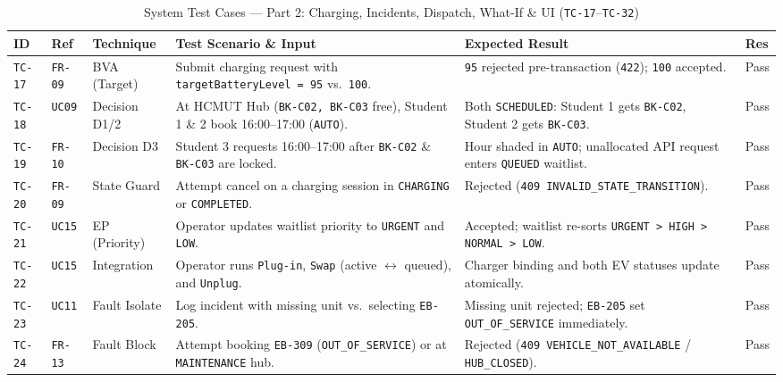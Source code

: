 \begin{table}[H]
  \centering
  \singlespacing\scriptsize
  \caption{System Test Cases --- Part 2: Charging, Incidents, Dispatch, What-If \& UI (\texttt{TC-17}--\texttt{TC-32})}
  \label{tab:tc-part2}
  \renewcommand{\arraystretch}{1.20}
  \begin{tabularx}{\textwidth}{|C{1.25cm}|C{1.40cm}|L{1.95cm}|Y|L{3.95cm}|C{0.95cm}|}
    \hline
    \textbf{ID} & \textbf{Ref} & \textbf{Technique} & \textbf{Test Scenario \& Input} & \textbf{Expected Result} & \textbf{Res} \\
    \hline
    \texttt{TC-17} & \texttt{FR-09} & BVA (Target) & Submit charging request with \texttt{targetBatteryLevel = 95} vs.\ \texttt{100}. & \texttt{95} rejected pre-transaction (\texttt{422}); \texttt{100} accepted. & Pass \\
    \hline
    \texttt{TC-18} & \texttt{UC09} & Decision D1/2 & At HCMUT Hub (\texttt{BK-C02, BK-C03} free), Student 1 \& 2 book 16:00--17:00 (\texttt{AUTO}). & Both \texttt{SCHEDULED}: Student 1 gets \texttt{BK-C02}, Student 2 gets \texttt{BK-C03}. & Pass \\
    \hline
    \texttt{TC-19} & \texttt{FR-10} & Decision D3 & Student 3 requests 16:00--17:00 after \texttt{BK-C02} \& \texttt{BK-C03} are locked. & Hour shaded in \texttt{AUTO}; unallocated API request enters \texttt{QUEUED} waitlist. & Pass \\
    \hline
    \texttt{TC-20} & \texttt{FR-09} & State Guard & Attempt cancel on a charging session in \texttt{CHARGING} or \texttt{COMPLETED}. & Rejected (\texttt{409 INVALID\_\allowbreak STATE\_\allowbreak TRANSITION}). & Pass \\
    \hline
    \texttt{TC-21} & \texttt{UC15} & EP (Priority) & Operator updates waitlist priority to \texttt{URGENT} and \texttt{LOW}. & Accepted; waitlist re-sorts \texttt{URGENT > HIGH > NORMAL > LOW}. & Pass \\
    \hline
    \texttt{TC-22} & \texttt{UC15} & Integration & Operator runs \texttt{Plug-in}, \texttt{Swap} (active $\leftrightarrow$ queued), and \texttt{Unplug}. & Charger binding and both EV statuses update atomically. & Pass \\
    \hline
    \texttt{TC-23} & \texttt{UC11} & Fault Isolate & Log incident with missing unit vs.\ selecting \texttt{EB-205}. & Missing unit rejected; \texttt{EB-205} set \texttt{OUT\_\allowbreak OF\_\allowbreak SERVICE} immediately. & Pass \\
    \hline
    \texttt{TC-24} & \texttt{FR-13} & Fault Block & Attempt booking \texttt{EB-309} (\texttt{OUT\_\allowbreak OF\_\allowbreak SERVICE}) or at \texttt{MAINTENANCE} hub. & Rejected (\texttt{409 VEHICLE\_\allowbreak NOT\_\allowbreak AVAILABLE} / \texttt{HUB\_\allowbreak CLOSED}). & Pass \\

\end{tabularx}
\end{table}
